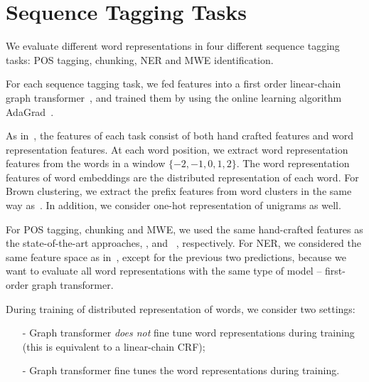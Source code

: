 \section{Sequence Tagging Tasks}
\label{sec:SeqTagging}
We evaluate different word representations in four different sequence tagging tasks: POS tagging, chunking, NER and MWE identification. 

For each sequence tagging task, we fed features into a first order linear-chain graph
transformer~\cite{collobert2011natural}, and trained them by using the online learning algorithm
AdaGrad~\cite{duchi2011adaptive}.

As in~\cite{turian2010word}, the features of each task consist of both hand crafted features and word representation features. At each word position, we extract word representation features from the words in a window $\{-2, -1, 0, 1, 2\}$. The word representation features of word embeddings are the distributed representation of each word.  For Brown clustering, we extract the prefix features from word clusters in the same way as~\cite{turian2010word}. In addition, we consider one-hot representation of unigrams as well.

For POS tagging, chunking and MWE, we used the same hand-crafted features as the state-of-the-art approaches,  ,  and ~, respectively. For NER, we considered the same feature space as in~\cite{turian2010word}, except for the previous two predictions, because we want to evaluate all word representations with the same type of model -- first-order graph transformer.

During training of distributed representation of words, we consider two settings: 

\begin{small}
\begin{itemize}
\item[-] Graph transformer \textit{does not} fine tune word representations during training (this is equivalent to a linear-chain CRF);
\item[-] Graph transformer fine tunes the word representations during training.
\end{itemize}
\end{small}

